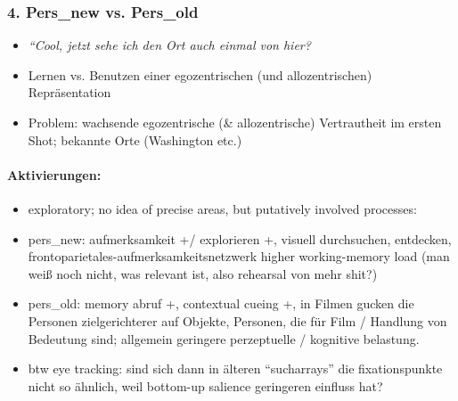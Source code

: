 \documentclass[10pt,a4paper,twocolumn]{article}
\begin{document}
\subsubsection*{4. Pers\_new vs. Pers\_old }
\begin{itemize}
	\item \emph{``Cool, jetzt sehe ich den Ort auch einmal von hier?}
	\item Lernen vs. Benutzen einer egozentrischen (und allozentrischen) Repräsentation
	\item Problem: wachsende egozentrische (\& allozentrische) Vertrautheit
	im ersten Shot; bekannte Orte (Washington etc.)
\end{itemize}

\paragraph*{Aktivierungen:}
\begin{itemize}
	\item exploratory; no idea of precise areas, but putatively involved processes:
	\item pers\_new: aufmerksamkeit +/ explorieren +, visuell durchsuchen, entdecken,
	frontoparietales-aufmerksamkeitsnetzwerk higher working-memory load
	(man weiß noch nicht, was relevant ist, also rehearsal von mehr shit?)
	\item pers\_old: memory abruf +, contextual cueing +, in Filmen gucken die
	Personen zielgerichterer auf Objekte, Personen, die für Film / Handlung
	von Bedeutung sind; allgemein geringere perzeptuelle / kognitive belastung.
	\item btw eye tracking: sind sich dann in älteren ``sucharrays'' die fixationspunkte
	nicht so ähnlich, weil bottom-up salience geringeren einfluss hat?
\end{itemize}
\end{document}
